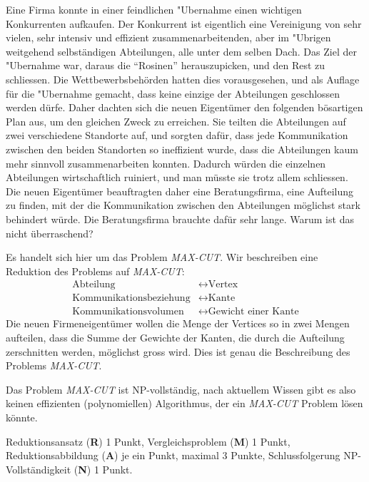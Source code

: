 Eine Firma konnte in einer feindlichen "Ubernahme einen wichtigen Konkurrenten
aufkaufen. Der Konkurrent ist eigentlich eine Vereinigung von sehr vielen,
sehr intensiv und effizient zusammenarbeitenden, aber im "Ubrigen weitgehend
selbständigen Abteilungen, alle unter dem selben Dach.
Das Ziel der "Ubernahme war, daraus die ``Rosinen'' herauszupicken, und
den Rest zu schliessen. Die Wettbewerbsbehörden hatten dies vorausgesehen,
und als Auflage für die "Ubernahme gemacht, dass keine einzige der Abteilungen
geschlossen werden dürfe.
Daher dachten sich die neuen Eigentümer den folgenden bösartigen Plan aus,
um den gleichen Zweck zu erreichen. Sie teilten die Abteilungen auf zwei 
verschiedene Standorte auf, und sorgten dafür, dass jede Kommunikation zwischen
den beiden Standorten so ineffizient wurde, dass die Abteilungen kaum mehr
sinnvoll zusammenarbeiten konnten.
Dadurch würden die einzelnen Abteilungen wirtschaftlich ruiniert, und man
müsste sie trotz allem schliessen.
Die neuen Eigentümer beauftragten daher eine Beratungsfirma, eine
Aufteilung zu finden, mit der die Kommunikation zwischen den Abteilungen
möglichst stark behindert würde.
Die Beratungsfirma brauchte dafür sehr lange. Warum ist das nicht
überraschend?

\begin{loesung}
Es handelt sich hier um das Problem \textsl{MAX-CUT}.
Wir beschreiben eine Reduktion des Problems auf \textsl{MAX-CUT}:
\begin{align*}
\text{Abteilung}&\leftrightarrow \text{Vertex} \\
\text{Kommunikationsbeziehung}&\leftrightarrow \text{Kante} \\
\text{Kommunikationsvolumen}&\leftrightarrow \text{Gewicht einer Kante}
\end{align*}
Die neuen Firmeneigentümer wollen die Menge der Vertices so in zwei
Mengen aufteilen, dass die Summe der Gewichte der Kanten, die durch die
Aufteilung zerschnitten werden, möglichst
gross wird. Dies ist genau die Beschreibung des Problems \textsl{MAX-CUT}.

Das Problem \textsl{MAX-CUT} ist NP-vollständig, nach aktuellem Wissen
gibt es also keinen effizienten (polynomiellen) Algorithmus, der ein
\textsl{MAX-CUT} Problem lösen könnte.
\end{loesung}

\begin{bewertung}
Reduktionsansatz ({\bf R}) 1 Punkt,
Vergleichsproblem ({\bf M}) 1 Punkt,
Reduktionsabbildung ({\bf A}) je ein Punkt, maximal 3 Punkte,
Schlussfolgerung NP-Vollständigkeit ({\bf N}) 1 Punkt.
\end{bewertung}

